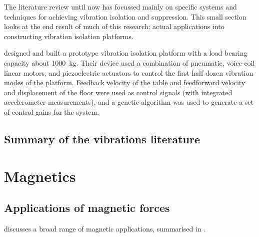The literature review until now has focussed mainly on specific systems and techniques for achieving vibration isolation and suppression.
This small section looks at the end result of much of this research: actual applications into constructing vibration isolation platforms.

\textcite{yoshioka2001} designed and built a prototype vibration isolation platform with a load bearing capacity about \SI{1000}{kg}.
Their device used a combination of pneumatic, voice-coil linear motors, and piezoelectric actuators to control the first half dozen vibration modes of the platform.
Feedback velocity of the table and feedforward velocity and displacement of the floor were used as control signals (with integrated accelerometer measurements), and a genetic algorithm was used to generate a set of control gains for the system.

\subsection{Summary of the vibrations literature}



\section{Magnetics}

\subsection{Applications of magnetic forces}

\textcite{coey2002} discusses a broad range of magnetic applications,
summarised in .

